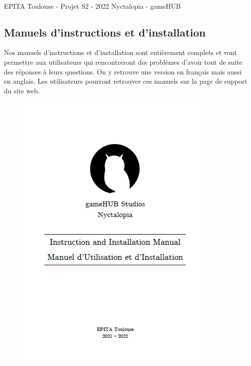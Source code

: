 \vfill
\noindent\makebox[\linewidth]{\rule{.8\paperwidth}{.6pt}}\\[0.2cm]
EPITA Toulouse - Projet S2 - 2022 \hfill Nyctalopia - gameHUB
\noindent\makebox[\linewidth]{\rule{.8\paperwidth}{.6pt}}
\newpage

\subsection{Manuels d'instructions et d'installation}
\setlength{\parindent}{5ex}
Nos manuels d'instructions et d'installation sont entièrement complets et vont permettre aux utilisateurs qui rencontreront des problèmes d'avoir tout de suite des réponses à leurs questions. On y retrouve une version en français mais aussi en anglais.
Les utilisateurs pourront retrouver ces manuels sur la page de support du site web.


\begin{figure}[H]
\centering
\begin{minipage}{.5\textwidth}
  \centering
  \centerline{\includegraphics[width=0.8\linewidth]{img/M1.png}}
  \label{fig:manual}
\end{minipage}%
\end{figure}


